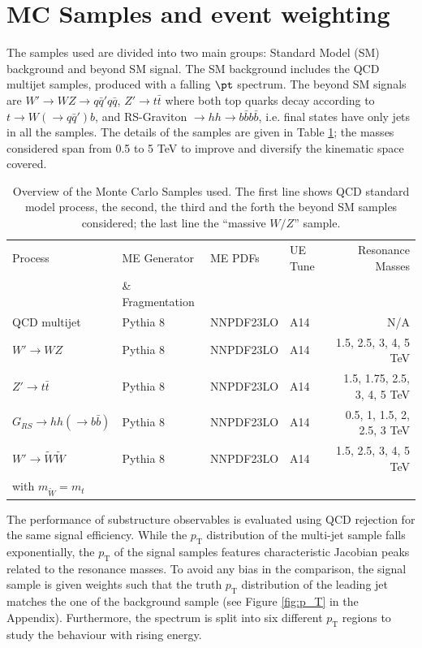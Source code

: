 \clearpage

\section{MC Samples and event weighting}
\label{sec:mcsample}
The samples used are divided into two main groups: Standard Model (SM) background and beyond SM signal. The SM background includes the QCD multijet samples, produced with a falling $\pt$ spectrum. The beyond SM signals are $W'\to WZ\to q\bar{q}'q\bar{q}$, $Z'\to t\bar{t}$ where both top quarks  decay according to $t\to W(\to q\bar{q}')b$, and RS-Graviton $\to hh \to b\bar{b}b\bar{b}$, i.e. final states have only jets in all the samples. The details of the samples are given in Table \ref{tab:mcsamples}; the masses considered span from 0.5 to 5 TeV to improve and diversify the kinematic space covered.


\begin{table}[b]
\centering
\begin{tabular}{l|lllr}  
\hline
\hline
Process & ME Generator & ME PDFs &  UE Tune & Resonance Masses\\
  & \& Fragmentation &  & & \\

\hline
QCD multijet &Pythia 8&NNPDF23LO & A14& N/A \\
\hline
$W'\to WZ$ &Pythia 8&NNPDF23LO & A14& 1.5, 2.5, 3, 4, 5 TeV \\
\cline{1-1}
$Z'\to t\bar{t}$ &Pythia 8&NNPDF23LO & A14& 1.5, 1.75, 2.5, 3, 4, 5 TeV \\
\cline{1-1}
$G_{RS} \to hh(\to b\bar{b})$ &Pythia 8&NNPDF23LO & A14& 0.5, 1, 1.5, 2, 2.5, 3 TeV\\
\cline{1-1}
$W' \to \tilde{W}\tilde{W}$ &Pythia 8&NNPDF23LO & A14& 1.5, 2.5, 3, 4, 5 TeV \\
with $m_{\tilde{W}}=m_t$ & & & & \\
\hline
\hline
\end{tabular}
\caption[Overview of the Monte Carlo Samples used]{Overview of the Monte Carlo Samples used. The first line shows QCD standard model process, the second, the third and the forth the beyond SM samples considered; the last line the ``massive $W/Z$'' sample.}
\label{tab:mcsamples}
\end{table}
The performance of substructure observables is evaluated using QCD rejection for the same signal efficiency. While the $p_{\mathrm{T}}$ distribution of the multi-jet sample falls exponentially, the $p_{\mathrm{T}}$ of the signal samples features characteristic Jacobian peaks related to the resonance masses. To avoid any bias in the comparison, the signal sample is given weights such that the truth $p_{\mathrm{T}}$ distribution of the leading jet matches the one of the background sample (see Figure \ref{fig:p_T} in the Appendix). Furthermore, the spectrum is split into six different $p_{\mathrm{T}}$ regions to study the behaviour with rising energy.






